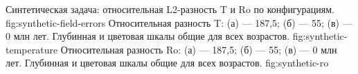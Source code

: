   {Синтетическая задача: относительная L2-разность T и Ro по конфигурациям.}
  {fig:synthetic-field-errors}
  {Относительная разность T: (а) --- 187,5; (б) --- 55; (в) --- 0 млн лет.
  Глубинная и цветовая шкалы общие для всех возрастов.}
  {fig:synthetic-temperature}
  {Относительная разность Ro: (а) --- 187,5; (б) --- 55; (в) --- 0 млн лет.
  Глубинная и цветовая шкалы общие для всех возрастов.}
  {fig:synthetic-ro}
